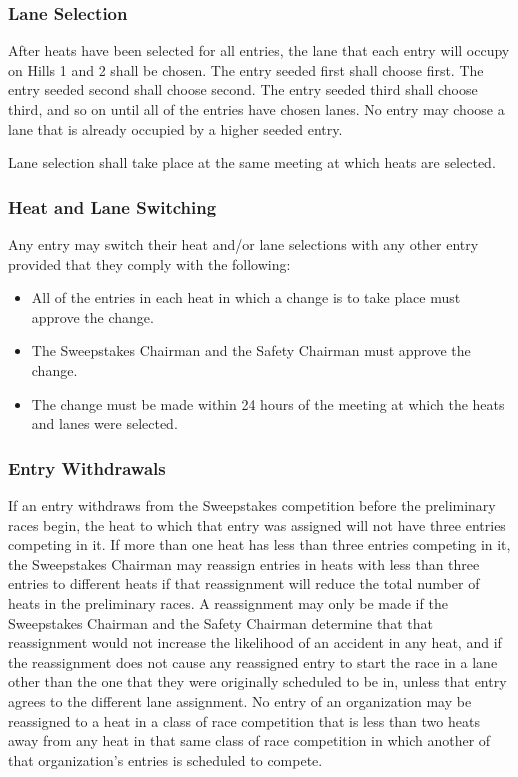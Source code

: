 \subsubsection{Lane Selection}

After heats have been selected for all entries, the lane that each entry will occupy on Hills 1 and 2 shall be chosen. The entry seeded first shall choose first. The entry seeded second shall choose second. The entry seeded third shall choose third, and so on until all of the entries have chosen lanes. No entry may choose a lane that is already occupied by a higher seeded entry.

Lane selection shall take place at the same meeting at which heats are selected.

\subsubsection{Heat and Lane Switching}

	Any entry may switch their heat and/or lane selections with any other entry provided that they comply with the following:
	
	\begin{itemize}
		\item All of the entries in each heat in which a change is to take place must approve the change.
		\item The Sweepstakes Chairman and the Safety Chairman must approve the change.
		\item The change must be made within 24 hours of the meeting at which the heats and lanes were selected.
	\end{itemize}

\subsubsection{Entry Withdrawals}
	If an entry withdraws from the Sweepstakes competition before the preliminary races begin, the heat to which that entry was assigned will not have three entries competing in it. If more than one heat has less than three entries competing in it, the Sweepstakes Chairman may reassign entries in heats with less than three entries to different heats if that reassignment will reduce the total number of heats in the preliminary races. A reassignment may only be made if the Sweepstakes Chairman and the Safety Chairman determine that that reassignment would not increase the likelihood of an accident in any heat, and if the reassignment does not cause any reassigned entry to start the race in a lane other than the one that they were originally scheduled to be in, unless that entry agrees to the different lane assignment. No entry of an organization may be reassigned to a heat in a class of race competition that is less than two heats away from any heat in that same class of race competition in which another of that organization's entries is scheduled to compete.

